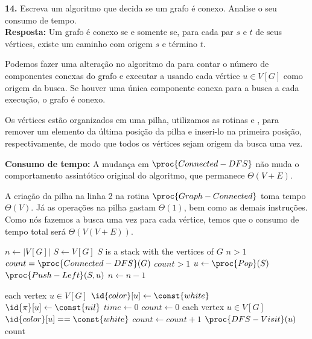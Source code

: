 
\noindent\textbf{14.} Escreva um algoritmo que decida se um grafo é conexo. Analise o seu consumo de tempo.\\[6pt]
\textbf{Resposta:} Um grafo é conexo se e somente se, para cada par $s$ e $t$ de seus vértices, existe um caminho com origem $s$ e término $t$.

Podemos fazer uma alteração no algoritmo da  para contar o número de componentes conexas do grafo e executar a  usando cada vértice $u \in V[G]$ como origem da busca. Se houver uma única componente conexa para a busca a cada execução, o grafo é conexo.

Os vértices estão organizados em uma pilha, utilizamos as rotinas  e , para remover um elemento da última posição da pilha e inseri-lo na primeira posição, respectivamente, de modo que todos os vértices sejam origem da busca uma vez.

\textbf{Consumo de tempo:} A mudança em $\proc{Connected-DFS}$ não muda o comportamento assintótico original do algoritmo, que permanece $\Theta(V + E)$.

A criação da pilha na linha 2 na rotina $\proc{Graph-Connected}$ toma tempo $\Theta(V)$. Já as operações na pilha gastam $\Theta(1)$, bem como as demais instruções. Como nós fazemos a busca uma vez para cada vértice, temos que o consumo de tempo total será $\Theta(V(V + E))$.

\begin{codebox}
\li	$n \gets |V[G]|$
\li	$S \gets V[G]$ \Comment $S$ is a stack with the vertices of $G$
\li \While $n > 1$
\li \Do
        $count = \proc{Connected-DFS}(G)$
\li     \If $count > 1$
\li     \Then 
            \Return {}
        \End
\li     $u \gets \proc{Pop}(S)$
\li     $\proc{Push-Left}(S, u)$
\li     $n \gets n - 1$
    \End
\li \Return {}
\end{codebox}

\begin{codebox}
\li \For each vertex $u \in V[G]$
\li \Do
        $\id{color}[u] \gets \const{white}$
\li     $\id{\pi}[u] \gets \const{nil}$
    \End
\li $time \gets 0$
\li $count \gets 0$
\li \For each vertex $u \in V[G]$
\li \Do
        \If $\id{color}[u] == \const{white}$
\li     \Then 
            $count \gets count + 1$
\li         $\proc{DFS-Visit}(u)$
        \End
    \End
\li \Return count
\end{codebox}